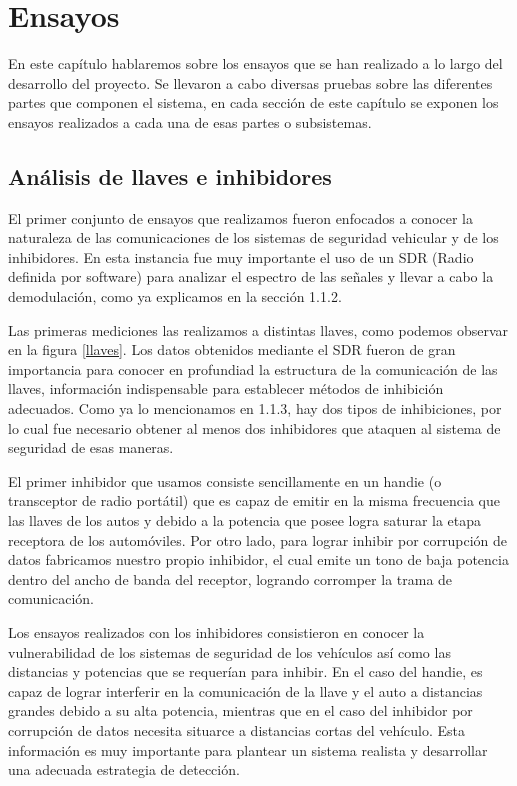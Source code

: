 \chapter{Ensayos}

En este capítulo hablaremos sobre los ensayos que se han realizado a lo largo del desarrollo del proyecto. Se llevaron a cabo diversas pruebas
sobre las diferentes partes que componen el sistema, en cada sección de este capítulo se exponen los ensayos realizados a cada una de esas partes
o subsistemas.

\section {Análisis de llaves e inhibidores} 

El primer conjunto de ensayos que realizamos fueron enfocados a conocer la naturaleza de las comunicaciones de los sistemas de seguridad vehicular
y de los inhibidores. En esta instancia fue muy importante el uso de un SDR (Radio definida por software) para analizar el espectro de las señales y
llevar a cabo la demodulación, como ya explicamos en la sección 1.1.2. \par 
Las primeras mediciones las realizamos a distintas llaves, como podemos observar en la figura \ref{llaves}. Los datos obtenidos mediante el SDR
fueron de gran importancia para conocer en profundiad la estructura de la comunicación de las llaves, información indispensable para establecer 
métodos de inhibición adecuados.
Como ya lo mencionamos en 1.1.3, hay dos tipos de inhibiciones, por lo cual fue necesario obtener al menos dos inhibidores que ataquen al sistema 
de seguridad de esas maneras. \par
El primer inhibidor que usamos consiste sencillamente en un handie (o transceptor de radio portátil) que es capaz
de emitir en la misma frecuencia que las llaves de los autos y debido a la potencia que posee logra saturar la etapa receptora de los automóviles.
Por otro lado, para lograr inhibir por corrupción de datos fabricamos nuestro propio inhibidor, el cual emite un tono de baja potencia dentro del ancho de banda
del receptor, logrando corromper la trama de comunicación.\par 

Los ensayos realizados con los inhibidores consistieron en conocer la vulnerabilidad de los sistemas de seguridad de los vehículos así como las
distancias y potencias que se requerían para inhibir. En el caso del handie, es capaz de lograr interferir en la comunicación de la llave y el auto a
distancias grandes debido a su alta potencia, mientras que en el caso del inhibidor por corrupción de datos necesita situarce a distancias
cortas del vehículo. Esta información es muy importante para plantear un sistema realista y desarrollar una adecuada estrategia de detección.

